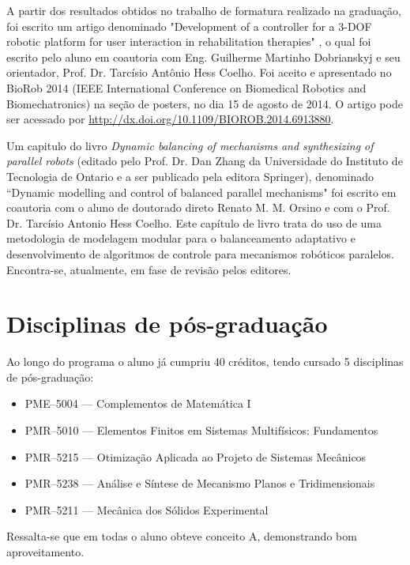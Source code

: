 \documentclass[a4paper,11pt,brazil,fleqn]{article}
\begin{document}
A partir dos resultados obtidos no trabalho de formatura realizado na gradua\c{c}\~ao, foi escrito um artigo denominado
"Development of a controller for a 3-DOF robotic platform for user interaction in rehabilitation therapies" \cite{Andre2}, o qual foi escrito pelo aluno em coautoria com Eng. Guilherme Martinho Dobrianskyj e seu orientador, Prof. Dr. Tarc\'isio Ant\^onio Hess Coelho. Foi aceito e apresentado no BioRob 2014 (IEEE International Conference on Biomedical Robotics and Biomechatronics) na se\c{c}\~ao de posters, no dia 15 de agosto de 2014. O artigo pode ser acessado por \url{http://dx.doi.org/10.1109/BIOROB.2014.6913880}.

Um capitulo do livro {\em Dynamic balancing of mechanisms and synthesizing of parallel
robots}  (editado pelo Prof. Dr. Dan Zhang da Universidade do Instituto de Tecnologia
de Ontario e a ser publicado pela editora Springer), denominado ``Dynamic modelling
and control of balanced parallel mechanisms" foi escrito em coautoria com o aluno de
doutorado direto Renato M. M. Orsino e com o Prof. Dr. Tarc\'isio Antonio Hess Coelho.
Este cap\'itulo de livro trata do uso de uma metodologia de modelagem modular para o
balanceamento adaptativo e desenvolvimento de algoritmos de controle para mecanismos
rob\'oticos paralelos. Encontra-se, atualmente, em fase de revis\~ao pelos editores.

\section{Disciplinas de p\'os-gradua\c{c}\~ao}\label{S06}

Ao longo do programa o aluno j\'a cumpriu 40 cr\'editos, tendo cursado 5 disciplinas 
de p\'os-gradua\c{c}\~ao:
\begin{itemize}
\item PME--5004 --- Complementos de Matem\'atica I
\item PMR--5010 --- Elementos Finitos em Sistemas Multif\'isicos: Fundamentos
\item PMR--5215 --- Otimiza\c{c}\~ao Aplicada ao Projeto de Sistemas Mec\^anicos
\item PMR--5238 --- An\'alise e S\'intese de Mecanismo Planos e Tridimensionais
\item PMR--5211 --- Mec\^anica dos S\'olidos Experimental
\end{itemize}

Ressalta-se que em todas o aluno obteve conceito A, demonstrando bom aproveitamento. \\
\end{document}
